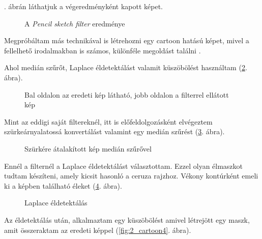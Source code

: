 . ábrán láthatjuk a végeredményként kapott képet.

\begin{figure}[h!]
\centering
{}
\caption{A \textit{Pencil sketch filter} eredménye} 
\label{fig:pencil7}
\end{figure}


Megpróbáltam más technikával is létrehozni egy cartoon hatású képet, mivel a fellelhető irodalmakban is számos, különféle megoldást találni \cite{emami}.

Ahol medián szűrőt, Laplace éldetektálást valamit küszöbölést használtam (\ref{fig:2_cartoon1}. ábra).

\begin{figure}[h!]
\centering
{}
\caption{Bal oldalon az eredeti kép látható, jobb oldalon a filterrel ellátott kép} 
\label{fig:2_cartoon1}
\end{figure}


Mint az eddigi saját filtereknél, itt is előfeldolgozásként elvégeztem szürkeárnyalatossá konvertálást valamint egy medián szűrést (\ref{fig:2_cartoon2}. ábra).

\begin{figure}[h!]
\centering
{}
\caption{Szürkére átalakított kép medián szűrővel} 
\label{fig:2_cartoon2}
\end{figure}


Ennél a filternél a Laplace éldetektálást választottam. Ezzel olyan élmaszkot tudtam készíteni, amely kicsit hasonló a ceruza rajzhoz. Vékony kontúrként emeli ki a képben található éleket (\ref{fig:2_cartoon3}. ábra).


\begin{figure}[h!]
\centering
{}
\caption{Laplace éldetektálás} 
\label{fig:2_cartoon3}
\end{figure}


Az éldetektálás után, alkalmaztam egy küszöbölést amivel létrejött egy maszk, amit összeraktam az eredeti képpel (\ref{fig:2_cartoon4}. ábra).

